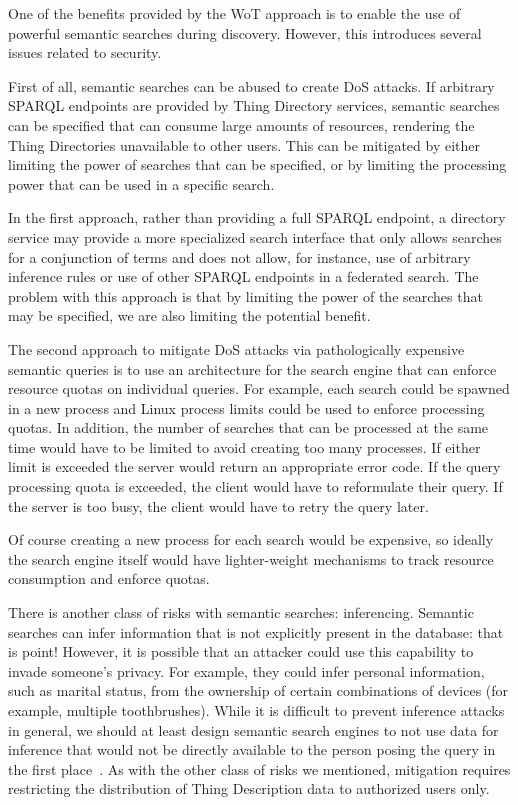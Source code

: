 One of the benefits provided by the WoT approach is to
enable the use of powerful semantic searches during discovery.
However, this introduces several issues related to security.

First of all, semantic searches can be abused to create DoS attacks.
If arbitrary SPARQL endpoints are provided by Thing Directory
services, semantic searches can be specified
that can consume large amounts of resources,
rendering the Thing Directories unavailable to other users.
This can be mitigated by either limiting the power of searches
that can be specified, or by limiting the processing
power that can be used in a specific search.

In the first approach, rather than providing a full
SPARQL endpoint, a directory service may provide a more specialized
search interface that only allows searches for a conjunction of terms
and does not allow, for instance, use of arbitrary inference rules
or use of other SPARQL endpoints in a federated search.
The problem with this approach is that by limiting the power
of the searches that may be specified, we are also limiting the
potential benefit.

The second approach to mitigate DoS attacks via pathologically
expensive semantic queries is to use an architecture for the 
search engine that can enforce resource quotas on individual queries.
For example, each search could be spawned in a new process and Linux
process limits could be used to enforce processing quotas. In addition,
the number of searches that can be processed at the same time would
have to be limited to avoid creating too many processes.
If either limit is exceeded the server would return an appropriate
error code.  If the query processing quota is exceeded, the client
would have to reformulate their query.  If the server is too busy,
the client would have to retry the query later.

Of course creating a new process for each search would be expensive,
so ideally the search engine itself would have lighter-weight
mechanisms to track resource consumption and enforce quotas.

There is another class of risks with semantic searches: 
inferencing.  Semantic searches can infer information that is
not explicitly present in the database: that is point!
However, it is possible that an attacker could use this capability
to invade someone's privacy.  For example, they could infer
personal information, such as marital status, from the ownership
of certain combinations of devices (for example, multiple toothbrushes).
While it is difficult to prevent inference attacks in general,
we should at least design semantic search engines to not use 
data for inference that would not be directly available to the
person posing the query in the first place~\cite{Thura2005a,Xia2014a}.  
As with the other class of risks we mentioned,
mitigation requires restricting the distribution of Thing Description
data to authorized users only.
